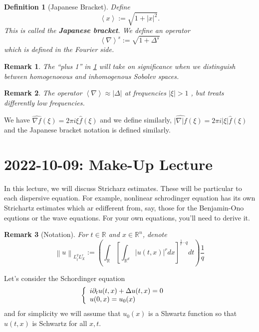 \documentclass{article}
\newtheorem{definition}{Definition}
\newtheorem{remark}{Remark}
\def\R{\mathbb{R}} %
\newcommand\norm[1]{\left\lVert#1\right\rVert}
\begin{document}
\begin{definition}[Japanese Bracket]
  \label{def:japanese-bracket}
  Define
  \begin{equation*}
    \left\langle x \right\rangle := \sqrt{1+|x|^{2}}.
  \end{equation*}
  This is called the \textbf{Japanese bracket}. We define an operator
  \begin{equation*}
    \left\langle \nabla \right\rangle^{s}:= \sqrt{1+\Delta^{s}}
  \end{equation*}
  which is defined in the Fourier side.
\end{definition}
\begin{remark}
  The ``plus 1'' in \cref{def:japanese-bracket} will take on significance when
  we distinguish between homogenoeous and inhomogenous Sobolev spaces.
\end{remark}
\begin{remark}
  The operator $\left\langle \nabla \right\rangle \approx |\Delta|$ at
  frequencies $|\xi|>1$ , but treats differently low frequencies.
\end{remark}
We have $\widehat{\nabla f}(\xi)=2\pi i \xi \hat{f}(\xi) $ and we define
similarly, $\widehat{|\nabla| f}(\xi)=2\pi i |\xi| \hat{f}(\xi) $  and the
Japanese bracket notation is defined similarly.

\section{2022-10-09: Make-Up Lecture}
In this lecture, we will discuss Stricharz estimates. These will be particular
to each dispersive equation. For example, nonlinear schrodinger equation has its
own Strichartz estimates which ar edifferent from, say,  those for the
Benjamin-Ono equtions or the wave equations. For your own equations, you'll need
to derive it.

\begin{remark}[Notation]
  For $t\in \R$ and $x\in \R^n$, denote
  \begin{equation*}
    \norm{u}_{L_{t}^{q}L_{X}^{r}}:= \left(  \int_{\R} \left[ \int_{\R^d}\left| u(t,x) \right|^{r}dx \right]^{\frac{1}{r}\cdot q}dt  \right) \frac{1}{q}
  \end{equation*}
\end{remark}
Let's consider the Schordinger equation
\begin{equation}\label{eq:nonlinear-schrodinger}
  \left\{ \begin{array}{l@{\quad\quad}l}
      i\partial_{t}u(t,x) +\Delta u(t,x) = 0 \\
      u(0,x)=u_{0}(x) 
    \end{array}\right.
\end{equation}
and for simplicity we will assume that $u_{0}(x)$ is a Shwartz function so that
$u(t,x)$ is Schwartz for all $x,t$.
\end{document}
